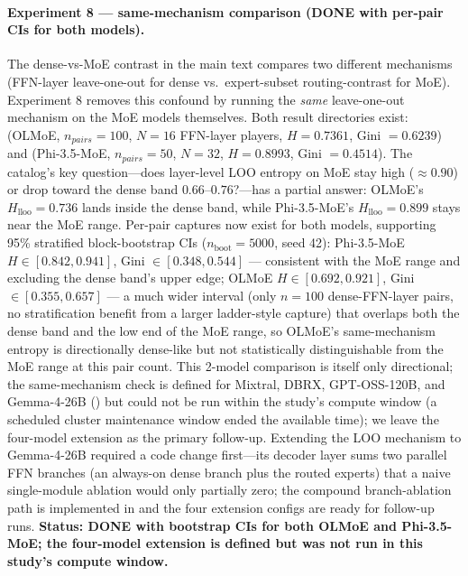 \documentclass[sigconf]{acmart}
\begin{document}
\paragraph{Experiment 8 --- same-mechanism comparison (DONE with
per-pair CIs for both models).}
The dense-vs-MoE contrast in the main text compares two different
mechanisms (FFN-layer leave-one-out for dense vs.~expert-subset
routing-contrast for MoE). Experiment 8 removes this confound by running the
\emph{same} leave-one-out mechanism on the MoE models themselves. Both result
directories exist: 
(OLMoE, $n_{pairs}=100$, $N=16$ FFN-layer players, $H = 0.7361$,
Gini $= 0.6239$) and
 (Phi-3.5-MoE,
$n_{pairs}=50$, $N=32$, $H = 0.8993$, Gini $=
0.4514$). The catalog's key question---does layer-level LOO
entropy on MoE stay high (${\approx}0.90$) or drop toward the dense band
$0.66$--$0.76$?---has a partial answer: OLMoE's $H_{\mathrm{lloo}} = 0.736$
lands inside the dense band, while Phi-3.5-MoE's $H_{\mathrm{lloo}} = 0.899$
stays near the MoE range. Per-pair captures now exist for both models,
supporting 95\% stratified block-bootstrap CIs ($n_{\mathrm{boot}}=5000$,
seed 42): Phi-3.5-MoE $H \in [0.842, 0.941]$, Gini $\in [0.348, 0.544]$ ---
consistent with the MoE range and excluding the dense band's upper edge;
OLMoE $H \in [0.692, 0.921]$, Gini $\in [0.355, 0.657]$ --- a much wider
interval (only $n=100$ dense-FFN-layer pairs, no stratification benefit
from a larger ladder-style capture) that overlaps both the dense band and
the low end of the MoE range, so OLMoE's same-mechanism entropy is
directionally dense-like but not statistically distinguishable from the
MoE range at this pair count. This 2-model comparison is itself only
directional; the same-mechanism check is defined for Mixtral, DBRX,
GPT-OSS-120B, and Gemma-4-26B ()
but could not be run within the study's compute window (a scheduled
cluster maintenance window ended the available time); we leave the
four-model extension as the primary follow-up. Extending the LOO
mechanism to Gemma-4-26B required a code change first---its decoder
layer sums two parallel FFN branches (an always-on dense branch plus the
routed experts) that a naive single-module ablation would only partially
zero; the compound branch-ablation path is implemented in
 and the four extension
configs are ready for follow-up runs. \textbf{Status: DONE
with bootstrap CIs for both OLMoE and Phi-3.5-MoE; the four-model
extension is defined but was not run in this study's compute window.}
\end{document}
